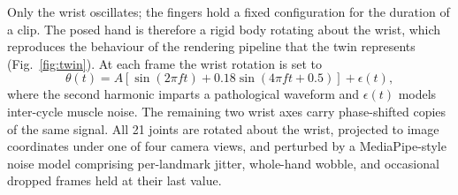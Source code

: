 \documentclass[conference]{IEEEtran}
\begin{document}
Only the wrist oscillates; the fingers hold a fixed configuration for the duration
of a clip. The posed hand is therefore a rigid body rotating about the wrist, which
reproduces the behaviour of the rendering pipeline that the twin represents
(Fig.~\ref{fig:twin}). At each frame the wrist rotation is set to
\begin{equation}
\theta(t) = A\left[\sin(2\pi f t) + 0.18\sin(4\pi f t + 0.5)\right] + \epsilon(t),
\end{equation}
where the second harmonic imparts a pathological waveform and $\epsilon(t)$ models
inter-cycle muscle noise. The remaining two wrist axes carry phase-shifted copies
of the same signal. All 21 joints are rotated about the wrist, projected to image
coordinates under one of four camera views, and perturbed by a MediaPipe-style
noise model comprising per-landmark jitter, whole-hand wobble, and occasional
dropped frames held at their last value.
\end{document}
